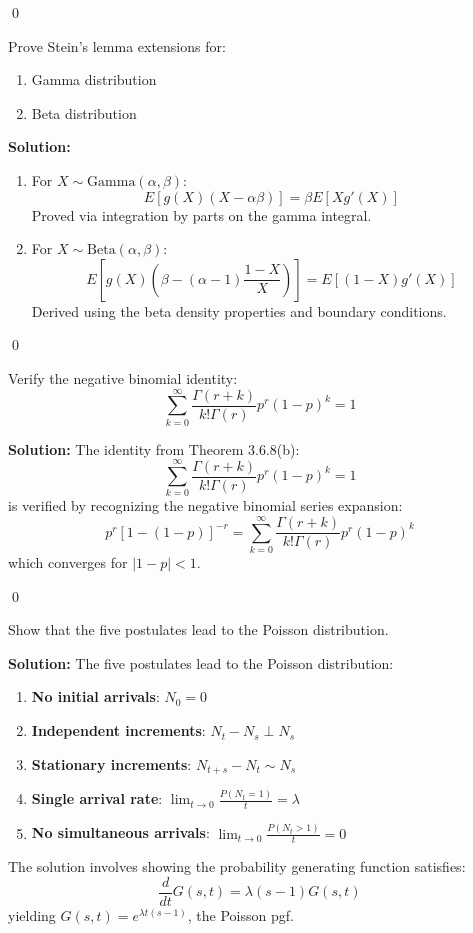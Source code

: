 \qed
\begin{problembox}
Prove Stein's lemma extensions for:
\begin{enumerate}[label=(\alph*)]
\item Gamma distribution
\item Beta distribution
\end{enumerate}
\end{problembox}

\noindent\textbf{Solution:}
\begin{enumerate}[label=(\alph*)]
\item For $X \sim \text{Gamma}(\alpha,\beta)$:
\[ E[g(X)(X-\alpha\beta)] = \beta E[Xg'(X)] \]
Proved via integration by parts on the gamma integral.

\item For $X \sim \text{Beta}(\alpha,\beta)$:
\[ E\left[g(X)\left(\beta - (\alpha-1)\frac{1-X}{X}\right)\right] = E[(1-X)g'(X)] \]
Derived using the beta density properties and boundary conditions.
\end{enumerate}


\qed
\begin{problembox}
Verify the negative binomial identity:
\[ \sum_{k=0}^\infty \frac{\Gamma(r+k)}{k!\Gamma(r)}p^r(1-p)^k = 1 \]
\end{problembox}

\noindent\textbf{Solution:}
The identity from Theorem 3.6.8(b):
\[ \sum_{k=0}^\infty \frac{\Gamma(r+k)}{k!\Gamma(r)}p^r(1-p)^k = 1 \]
is verified by recognizing the negative binomial series expansion:
\[ p^r[1-(1-p)]^{-r} = \sum_{k=0}^\infty \frac{\Gamma(r+k)}{k!\Gamma(r)}p^r(1-p)^k \]
which converges for $|1-p| < 1$.


\qed
\begin{problembox}
Show that the five postulates lead to the Poisson distribution.
\end{problembox}

\noindent\textbf{Solution:}
The five postulates lead to the Poisson distribution:
\begin{enumerate}
\item \textbf{No initial arrivals}: $N_0 = 0$
\item \textbf{Independent increments}: $N_t - N_s \perp N_s$
\item \textbf{Stationary increments}: $N_{t+s} - N_t \sim N_s$
\item \textbf{Single arrival rate}: $\lim_{t\to 0}\frac{P(N_t=1)}{t} = \lambda$
\item \textbf{No simultaneous arrivals}: $\lim_{t\to 0}\frac{P(N_t>1)}{t} = 0$
\end{enumerate}

The solution involves showing the probability generating function satisfies:
\[ \frac{d}{dt}G(s,t) = \lambda(s-1)G(s,t) \]
yielding $G(s,t) = e^{\lambda t(s-1)}$, the Poisson pgf.

